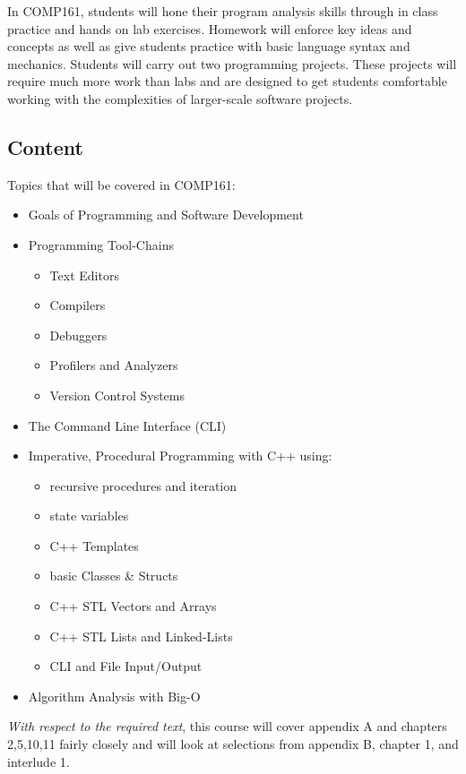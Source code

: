 \documentclass[10pt]{article}
\begin{document}
In COMP161, students will hone their program analysis skills through in class practice and hands on lab exercises.  Homework will enforce key ideas and concepts as well as give students practice with basic language syntax and mechanics.  Students will carry out two programming projects.  These projects will require much more work than labs and are designed to get students comfortable working with the complexities of larger-scale software projects.

\subsection{Content}

Topics that will be covered in COMP161:
\begin{itemize}
\item Goals of Programming and Software Development
\item Programming Tool-Chains
\begin{itemize}
\item Text Editors
\item Compilers
\item Debuggers
\item Profilers and Analyzers
\item Version Control Systems
\end{itemize}
\item The Command Line Interface (CLI) 
\item Imperative, Procedural Programming with C++ using:
\begin{itemize}
\item recursive procedures and iteration
\item state variables
\item C++ Templates
\item basic Classes \& Structs
\item C++ STL Vectors and Arrays
\item C++ STL Lists and Linked-Lists
\item CLI and File Input/Output
\end{itemize}
\item Algorithm Analysis with Big-O
\end{itemize}  

\textit{With respect to the required text}, this course will cover appendix A and chapters 2,5,10,11 fairly closely and will look at selections from appendix B, chapter 1, and interlude 1. 
\end{document}
